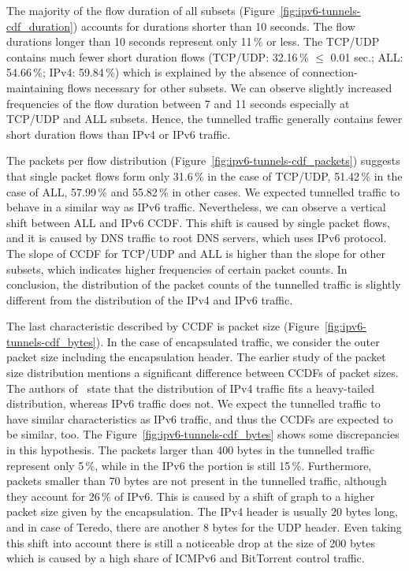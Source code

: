 The majority of the flow duration of all subsets (Figure~\ref{fig:ipv6-tunnels-cdf_duration}) accounts for durations shorter than 10 seconds. The flow durations longer than 10 seconds represent only 11\,\% or less. The TCP/UDP contains much fewer short duration flows (TCP/UDP: 32.16\,\% $\leq$ 0.01 sec.; ALL: 54.66\,\%; IPv4: 59.84\,\%) which is explained by the absence of connection-maintaining flows necessary for other subsets. We can observe slightly increased frequencies of the flow duration between 7 and 11 seconds especially at TCP/UDP and ALL subsets. Hence, the tunnelled traffic generally contains fewer short duration flows than IPv4 or IPv6 traffic.

The packets per flow distribution (Figure~\ref{fig:ipv6-tunnels-cdf_packets}) suggests that single packet flows form only 31.6\,\% in the case of TCP/UDP, 51.42\,\% in the case of ALL, 57.99\,\% and 55.82\,\% in other cases. We expected tunnelled traffic to behave in a similar way as IPv6 traffic. Nevertheless, we can observe a vertical shift between ALL and IPv6 CCDF. This shift is caused by single packet flows, and it is caused by DNS traffic to root DNS servers, which uses IPv6 protocol. The slope of CCDF for TCP/UDP and ALL is higher than the slope for other subsets, which indicates higher frequencies of certain packet counts. In conclusion, the distribution of the packet counts of the tunnelled traffic is slightly different from the distribution of the IPv4 and IPv6 traffic.

The last characteristic described by CCDF is packet size (Figure~\ref{fig:ipv6-tunnels-cdf_bytes}). In the case of encapsulated traffic, we consider the outer packet size including the encapsulation header. The earlier study of the packet size distribution mentions a significant difference between CCDFs of packet sizes. The authors of~\cite{Ciflikli-2012-Packet} state that the distribution of IPv4 traffic fits a heavy-tailed distribution, whereas IPv6 traffic does not. We expect the tunnelled traffic to have similar characteristics as IPv6 traffic, and thus the CCDFs are expected to be similar, too. The Figure~\ref{fig:ipv6-tunnels-cdf_bytes} shows some discrepancies in this hypothesis. The packets larger than 400 bytes in the tunnelled traffic represent only 5\,\%, while in the IPv6 the portion is still 15\,\%. Furthermore, packets smaller than 70 bytes are not present in the tunnelled traffic, although they account for 26\,\% of IPv6. This is caused by a shift of graph to a higher packet size given by the encapsulation. The IPv4 header is usually 20 bytes long, and in case of Teredo, there are another 8 bytes for the UDP header. Even taking this shift into account there is still a noticeable drop at the size of 200 bytes which is caused by a high share of ICMPv6 and BitTorrent control traffic.


